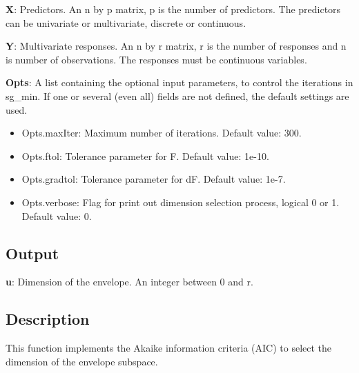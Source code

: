 \documentclass[a4paper,11pt,openany]{memoir}
\begin{document}
\begin{par}
\textbf{X}: Predictors. An n by p matrix, p is the number of predictors. The predictors can be univariate or multivariate, discrete or continuous.
\end{par} \vspace{1em}
\begin{par}
\textbf{Y}: Multivariate responses. An n by r matrix, r is the number of responses and n is number of observations. The responses must be continuous variables.
\end{par} \vspace{1em}
\begin{par}
\textbf{Opts}: A list containing the optional input parameters, to control the iterations in sg\_min. If one or several (even all) fields are not defined, the default settings are used.
\end{par} \vspace{1em}
\begin{itemize}
\setlength{\itemsep}{-1ex}
   \item Opts.maxIter: Maximum number of iterations.  Default value: 300.
   \item Opts.ftol: Tolerance parameter for F.  Default value: 1e-10.
   \item Opts.gradtol: Tolerance parameter for dF.  Default value: 1e-7.
   \item Opts.verbose: Flag for print out dimension selection process, logical 0 or 1. Default value: 0.
\end{itemize}


\subsection*{Output}

\begin{par}
\textbf{u}: Dimension of the envelope. An integer between 0 and r.
\end{par} \vspace{1em}


\subsection*{Description}

\begin{par}
This function implements the Akaike information criteria (AIC) to select the dimension of the envelope subspace.
\end{par} \vspace{1em}
\end{document}
